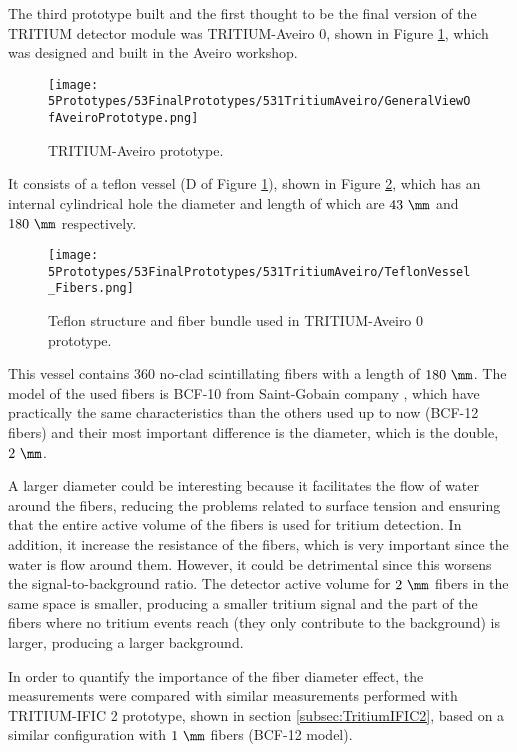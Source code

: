 The third prototype built and the first thought to be the final version of the TRITIUM detector module was TRITIUM-Aveiro 0, shown in Figure \ref{fig:TritiumAveiro0}, which was designed and built in the Aveiro workshop. 

\begin{figure}[h]
\centering
\texttt{[image: 5Prototypes/53FinalPrototypes/531TritiumAveiro/GeneralViewOfAveiroPrototype.png]}
\caption{TRITIUM-Aveiro prototype.\label{fig:TritiumAveiro0}}
\end{figure}


It consists of a teflon vessel (D of Figure \ref{fig:TritiumAveiro0}), shown in Figure \ref{fig:TeflonStructureFibersTritiumAveiro0}, which has an internal cylindrical hole the diameter and length of which are $43~\mm$ and $180~\mm$ respectively. 

\begin{figure}[h]
\centering
\texttt{[image: 5Prototypes/53FinalPrototypes/531TritiumAveiro/TeflonVessel\_Fibers.png]}
\caption{Teflon structure and fiber bundle used in TRITIUM-Aveiro 0 prototype.\label{fig:TeflonStructureFibersTritiumAveiro0}}
\end{figure}

This vessel contains $360$ no-clad scintillating fibers with a length of $180~\mm$. The model of the used fibers is BCF-10 from Saint-Gobain company \cite{DataSheetBCF10Fiber}, which have practically the same characteristics than the others used up to now (BCF-12 fibers) and their most important difference is the diameter, which is the double, $2~\mm$.

A larger diameter could be interesting because it facilitates the flow of water around the fibers, reducing the problems related to surface tension and ensuring that the entire active volume of the fibers is used for tritium detection. In addition, it increase the resistance of the fibers, which is very important since the water is flow around them. However, it could be detrimental since this worsens the signal-to-background ratio. The detector active volume for $2~\mm$ fibers in the same space is smaller, producing a smaller tritium signal and the part of the fibers where no tritium events reach (they only contribute to the background) is larger, producing a larger background.

In order to quantify the importance of the fiber diameter effect, the measurements were compared with similar measurements performed with TRITIUM-IFIC 2 prototype, shown in section \ref{subsec:TritiumIFIC2}, based on a similar configuration with $1~\mm$ fibers (BCF-12 model).

